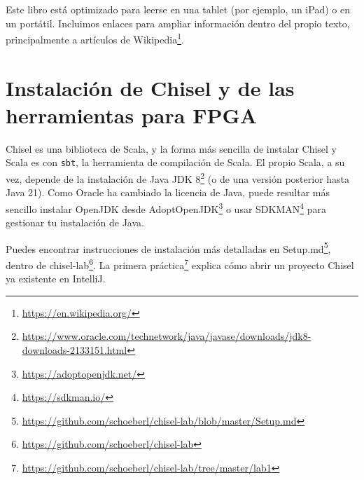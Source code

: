 \documentclass[%
    10pt,
    headinclude, footinclude=false,
    openright, %
    notitlepage,
    cleardoublepage=empty,
    headsepline,
    numbers=noenddot,
    bibliography=totoc, index=totoc,
    ]{scrbook}
\newcommand{\code}[1]{{\lstinline[basicstyle=\small\ttfamily]{#1}}}
\newcommand{\myref}[2]{\href{#1}{#2}}
\renewcommand{\myref}[2]{{#2}{\footnote{\url{#1}}}}
\begin{document}

Este libro está optimizado para leerse en una tablet (por ejemplo, un iPad) o en un portátil.
Incluimos enlaces para ampliar información dentro del propio texto, principalmente a
artículos de \myref{https://en.wikipedia.org/}{Wikipedia}.

\section{Instalación de Chisel y de las herramientas para FPGA}


Chisel es una biblioteca de Scala, y la forma más sencilla de instalar Chisel y Scala es
con \code{sbt}, la herramienta de compilación de Scala. El propio Scala, a su vez, depende de la instalación
de \myref{https://www.oracle.com/technetwork/java/javase/downloads/jdk8-downloads-2133151.html}{Java JDK 8}
(o de una versión posterior hasta Java 21).
Como Oracle ha cambiado la licencia de Java, puede resultar más sencillo
instalar OpenJDK desde \myref{https://adoptopenjdk.net/}{AdoptOpenJDK}
o usar \myref{https://sdkman.io/}{SDKMAN} para gestionar tu instalación de Java.


Puedes encontrar instrucciones de instalación más detalladas en
\myref{https://github.com/schoeberl/chisel-lab/blob/master/Setup.md}{Setup.md},
dentro de \myref{https://github.com/schoeberl/chisel-lab}{chisel-lab}.
La \myref{https://github.com/schoeberl/chisel-lab/tree/master/lab1}{primera práctica}
explica cómo abrir un proyecto Chisel ya existente en IntelliJ.
\end{document}
